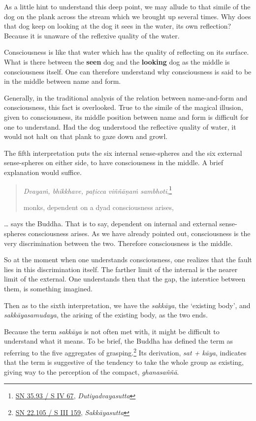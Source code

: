 As a little hint to understand this deep point, we may allude to that simile of the dog on the plank across the stream which we brought up several times. Why does that dog keep on looking at the dog it sees in the water, its own reflection? Because it is unaware of the reflexive quality of the water.

Consciousness is like that water which has the quality of reflecting on its surface. What is there between the \textbf{seen} dog and the \textbf{looking} dog as the middle is consciousness itself. One can therefore understand why consciousness is said to be in the middle between name and form.

Generally, in the traditional analysis of the relation between name-and-form and consciousness, this fact is overlooked. True to the simile of the magical illusion, given to consciousness, its middle position between name and form is difficult for one to understand. Had the dog understood the reflective quality of water, it would not halt on that plank to gaze down and growl.

The fifth interpretation puts the six internal sense-spheres and the six external sense-spheres on either side, to have consciousness in the middle. A brief explanation would suffice.

\begin{quote}
\emph{Dvayaṁ, bhikkhave, paṭicca viññāṇaṁ sambhoti},\footnote{\href{https://suttacentral.net/sn35.93/pli/ms}{SN 35.93 / S IV 67}, \emph{Dutiyadvayasutta}}

monks, dependent on a dyad consciousness arises,
\end{quote}

\ldots{} says the Buddha. That is to say, dependent on internal and external sense-spheres consciousness arises. As we have already pointed out, consciousness is the very discrimination between the two. Therefore consciousness is the middle.

So at the moment when one understands consciousness, one realizes that the fault lies in this discrimination itself. The farther limit of the internal is the nearer limit of the external. One understands then that the gap, the interstice between them, is something imagined.

Then as to the sixth interpretation, we have the \emph{sakkāya}, the `existing body', and \emph{sakkāyasamudaya}, the arising of the existing body, as the two ends.

Because the term \emph{sakkāya} is not often met with, it might be difficult to understand what it means. To be brief, the Buddha has defined the term as referring to the five aggregates of grasping.\footnote{\href{https://suttacentral.net/sn22.105/pli/ms}{SN 22.105 / S III 159}, \emph{Sakkāyasutta}} Its derivation, \emph{sat + kāya}, indicates that the term is suggestive of the tendency to take the whole group as existing, giving way to the perception of the compact, \emph{ghanasaññā}.

